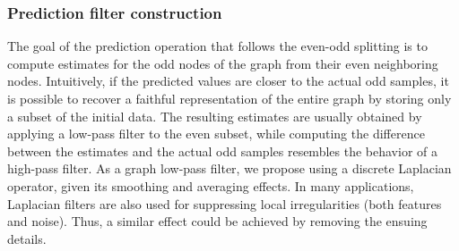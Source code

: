 \documentclass[graybox]{svmult}
\begin{document}
	\subsubsection{Prediction filter construction}
	The goal of the prediction operation that follows the even-odd splitting is to compute estimates for the odd nodes of the graph from their even neighboring nodes. Intuitively, if the predicted values are closer to the actual odd samples, it is possible to recover a faithful representation of the entire graph by storing only a subset of the initial data. The resulting estimates are usually obtained by applying a low-pass filter to the even subset, while computing the difference between the estimates and the actual odd samples resembles the behavior of a high-pass filter. As a graph low-pass filter, we propose using a discrete Laplacian operator, given its smoothing and averaging effects. In many applications, Laplacian filters are also used for suppressing local irregularities (both features and noise). Thus, a similar effect could be achieved by removing the ensuing details.
	
\end{document}
